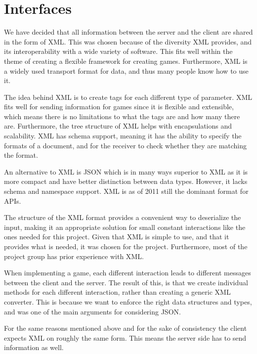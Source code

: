 \section{Interfaces} \label{subsec:interfaces}

We have decided that all information between the server and the client are shared in the form of XML. This was chosen because of the diversity XML provides, and its interoperability with a wide variety of software. This fits well within the theme of creating a flexible framework for creating games. Furthermore, XML is a widely used transport format for data, and thus many people know how to use it.

The idea behind XML is to create tags for each different type of parameter. XML fits well for sending information for games since it is flexible and extensible, which means there is no limitations to what the tags are and how many there are. Furthermore, the tree structure of XML helps with encapsulations and scalability. XML has schema support, meaning it has the ability to specify the formats of a document, and for the receiver to check whether they are matching the format. \cite{xml}

An alternative to XML is JSON which is in many ways superior to XML as it is more compact and have better distinction between data types. However, it lacks schema and namespace support. XML is as of 2011 still the dominant format for APIs.\cite{xml-json}

The structure of the XML format provides a convenient way to deserialize the input, making it an appropriate solution for small constant interactions like the ones needed for this project. Given that XML is simple to use, and that it provides what is needed, it was chosen for the project. Furthermore, most of the project group has prior experience with XML.

When implementing a game, each different interaction leads to different messages between the client and the server. The result of this, is that we create individual methods for each different interaction, rather than creating a generic XML converter. This is because we want to enforce the right data structures and types, and was one of the main arguments for considering JSON.

For the same reasons mentioned above and for the sake of consistency the client expects XML on roughly the same form. This means the server side has to send information as well.
